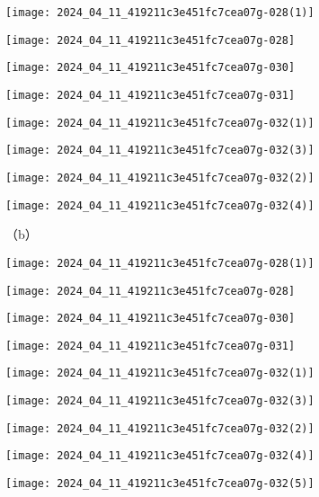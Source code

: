 \begin{center}
\texttt{[image: 2024\_04\_11\_419211c3e451fc7cea07g-028(1)]}
\end{center}
\begin{center}
\texttt{[image: 2024\_04\_11\_419211c3e451fc7cea07g-028]}
\end{center}
\begin{center}
\texttt{[image: 2024\_04\_11\_419211c3e451fc7cea07g-030]}
\end{center}
\begin{center}
\texttt{[image: 2024\_04\_11\_419211c3e451fc7cea07g-031]}
\end{center}
\begin{center}
\texttt{[image: 2024\_04\_11\_419211c3e451fc7cea07g-032(1)]}
\end{center}
\begin{center}
\texttt{[image: 2024\_04\_11\_419211c3e451fc7cea07g-032(3)]}
\end{center}
\begin{center}
\texttt{[image: 2024\_04\_11\_419211c3e451fc7cea07g-032(2)]}
\end{center}
\begin{center}
\texttt{[image: 2024\_04\_11\_419211c3e451fc7cea07g-032(4)]}
\end{center}

（b）

\begin{center}
\texttt{[image: 2024\_04\_11\_419211c3e451fc7cea07g-028(1)]}
\end{center}
\begin{center}
\texttt{[image: 2024\_04\_11\_419211c3e451fc7cea07g-028]}
\end{center}
\begin{center}
\texttt{[image: 2024\_04\_11\_419211c3e451fc7cea07g-030]}
\end{center}
\begin{center}
\texttt{[image: 2024\_04\_11\_419211c3e451fc7cea07g-031]}
\end{center}
\begin{center}
\texttt{[image: 2024\_04\_11\_419211c3e451fc7cea07g-032(1)]}
\end{center}
\begin{center}
\texttt{[image: 2024\_04\_11\_419211c3e451fc7cea07g-032(3)]}
\end{center}
\begin{center}
\texttt{[image: 2024\_04\_11\_419211c3e451fc7cea07g-032(2)]}
\end{center}
\begin{center}
\texttt{[image: 2024\_04\_11\_419211c3e451fc7cea07g-032(4)]}
\end{center}
\begin{center}
\texttt{[image: 2024\_04\_11\_419211c3e451fc7cea07g-032(5)]}
\end{center}

